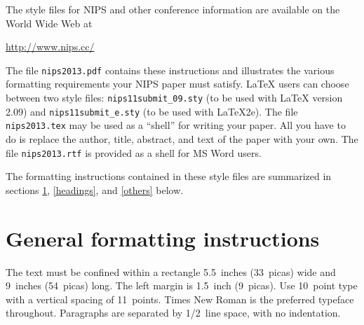 \documentclass{article} %
\begin{document}
The style files for NIPS and other conference information are available on the World Wide Web at
\begin{center}
   \url{http://www.nips.cc/}
\end{center}
The file \verb+nips2013.pdf+ contains these 
instructions and illustrates the
various formatting requirements your NIPS paper must satisfy. \LaTeX{}
users can choose between two style files:
\verb+nips11submit_09.sty+ (to be used with \LaTeX{} version 2.09) and
\verb+nips11submit_e.sty+ (to be used with \LaTeX{}2e). The file
\verb+nips2013.tex+ may be used as a ``shell'' for writing your paper. All you
have to do is replace the author, title, abstract, and text of the paper with
your own. The file
\verb+nips2013.rtf+ is provided as a shell for MS Word users.

The formatting instructions contained in these style files are summarized in
sections \ref{gen_inst}, \ref{headings}, and \ref{others} below.




\section{General formatting instructions}
\label{gen_inst}

The text must be confined within a rectangle 5.5~inches (33~picas) wide and
9~inches (54~picas) long. The left margin is 1.5~inch (9~picas).
Use 10~point type with a vertical spacing of 11~points. Times New Roman is the
preferred typeface throughout. Paragraphs are separated by 1/2~line space,
with no indentation.
\end{document}
